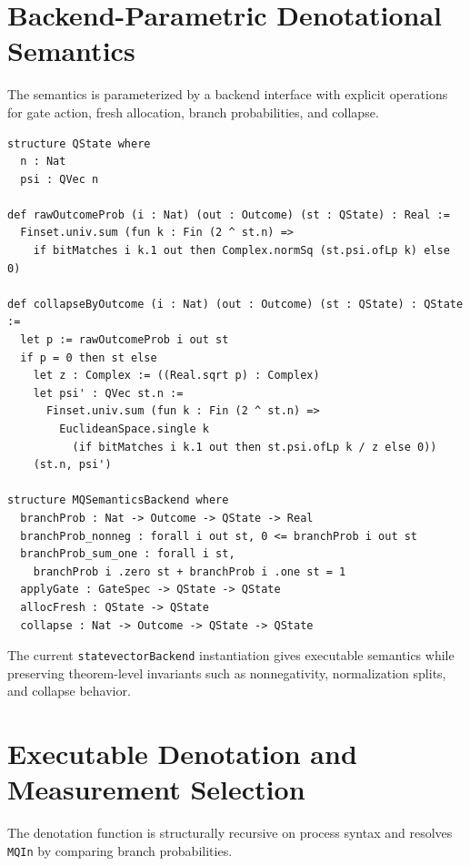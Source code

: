 \documentclass[11pt]{article}
\begin{document}
\section{Backend-Parametric Denotational Semantics}
The semantics is parameterized by a backend interface with explicit operations for gate action, fresh allocation, branch probabilities, and collapse.

\begin{lstlisting}[caption={Runtime state and backend interface (from \texttt{Backend.lean})}]
structure QState where
  n : Nat
  psi : QVec n

def rawOutcomeProb (i : Nat) (out : Outcome) (st : QState) : Real :=
  Finset.univ.sum (fun k : Fin (2 ^ st.n) =>
    if bitMatches i k.1 out then Complex.normSq (st.psi.ofLp k) else 0)

def collapseByOutcome (i : Nat) (out : Outcome) (st : QState) : QState :=
  let p := rawOutcomeProb i out st
  if p = 0 then st else
    let z : Complex := ((Real.sqrt p) : Complex)
    let psi' : QVec st.n :=
      Finset.univ.sum (fun k : Fin (2 ^ st.n) =>
        EuclideanSpace.single k
          (if bitMatches i k.1 out then st.psi.ofLp k / z else 0))
    (st.n, psi')

structure MQSemanticsBackend where
  branchProb : Nat -> Outcome -> QState -> Real
  branchProb_nonneg : forall i out st, 0 <= branchProb i out st
  branchProb_sum_one : forall i st,
    branchProb i .zero st + branchProb i .one st = 1
  applyGate : GateSpec -> QState -> QState
  allocFresh : QState -> QState
  collapse : Nat -> Outcome -> QState -> QState
\end{lstlisting}

The current \texttt{statevectorBackend} instantiation gives executable semantics while preserving theorem-level invariants such as nonnegativity, normalization splits, and collapse behavior.

\section{Executable Denotation and Measurement Selection}
The denotation function is structurally recursive on process syntax and resolves \texttt{MQIn} by comparing branch probabilities.
\end{document}
